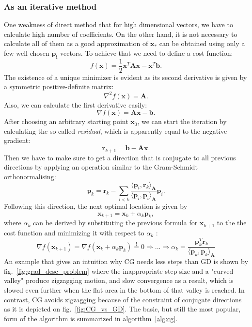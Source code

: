 \subsubsection{As an iterative method} One weakness of direct method that for high dimensional vectors, we have to calculate high number of coefficients. On the other hand, it is not necessary to calculate all of them as a good approximation of $\mathbf{x_* }$ can be obtained using only a few well chosen $\mathbf{p_i}$ vectors. To achieve that we need to define a cost function:
\[f(\mathbf{x}) = \frac{1}{2}\mathbf{x}^T \mathbf{Ax} - \mathbf{x}^T \mathbf{b}.\]
The existence of a unique minimizer is evident as its second derivative is given by a symmetric positive-definite matrix:
\[\nabla^2 f(\mathbf{x}) = \mathbf{A}.\]
Also, we can calculate the first derivative easily:
\[\nabla f(\mathbf{x}) = \mathbf{Ax} - \mathbf{b}.\]
After choosing an arbitrary starting point $\mathbf{x}_0$, we can start the iteration by calculating the so called \textit{residual}, which is apparently equal to the negative gradient:
\[\mathbf{r}_{k+1} = \mathbf{b} - \mathbf{Ax}.\]
Then we have to make sure to get a direction that is conjugate to all previous directions by applying an operation similar to the Gram-Schmidt orthonormalising:
\[\mathbf{p}_k = \mathbf{r}_k - \sum_{i<k} \frac{\langle \mathbf{p}_i, \mathbf{r}_k \rangle_\mathbf{A}}{\langle \mathbf{p}_i, \mathbf{p}_i \rangle_\mathbf{A}} \mathbf{p}_i.\]
Following this direction, the next optimal location is given by
\[\mathbf{x}_{k+1} = \mathbf{x}_k + \alpha_k \mathbf{p}_k,\]
where $\alpha_k$ can be derived by substituting the previous formula for $\mathbf{x}_{k+1}$ to the the cost function and minimizing it with respect to $\alpha_k$ :
\[\nabla f(\mathbf{x}_{k+1}) = \nabla f(\mathbf{x}_k + \alpha_k \mathbf{p}_k)  \overset{!}{=} 0 \Rightarrow ... \Rightarrow \alpha_k = \frac{\mathbf{p}_k^T \mathbf{r}_k}{\langle \mathbf{p}_k, \mathbf{p}_k \rangle_\mathbf{A}}\]
An example that gives an intuition why CG needs less steps than GD is shown by fig.~\ref{fig:grad_desc_problem} where the inappropriate step size and a "curved valley" produce zigzagging motion, and slow convergence as a result, which is slowed even further when the flat area in the bottom of that valley is reached. In contrast, CG avoids zigzagging because of the constraint of conjugate directions as it is depicted on fig.~\ref{fig:CG_vs_GD}. The basic, but still the most popular, form of the algorithm is summarized in algorithm~\ref{alg:cg}.


